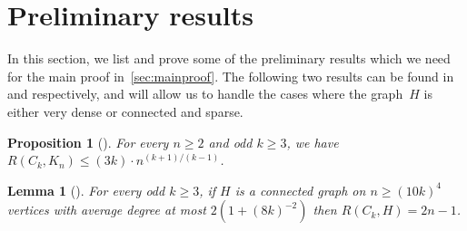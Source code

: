 \documentclass{article}
\newtheorem{proposition}[theorem]{Proposition}
\newtheorem{lemma}[theorem]{Lemma}
\newcommand{\af}[1]{\textcolor{orange}{\textbf{[AF: } #1\textbf{]}}}
\begin{document}
    




\section{Preliminary results}\label{sec:prelim}


In this section, we list and prove some of the preliminary results which we need for the main proof in~\cref{sec:mainproof}.
The following two results can be found in \cite[Thm.~1]{EFRS78} and \cite[Thm.~1.3]{FL25} respectively, and will allow us to handle the cases where the graph~$H$ is either very dense or connected and sparse.

\begin{proposition}[\cite{EFRS78, Sudakov02}]
\label{prop:dense}
    For every $n\ge2$ and odd $k\ge3$, we have $R(C_k, K_n) \le (3k)\cdot n^{(k+1)/(k-1)}$.
\end{proposition}


\begin{lemma}[\cite{BEFRS82,FL25}]
\label{lemma:sparse_connected}
For every odd $k\ge3$, if $H$ is a connected graph on $n\ge(10k)^4$ vertices with average degree at most $2(1+(8k)^{-2})$ then $R(C_k,H)= 2n-1$.
\end{lemma}
\end{document}
